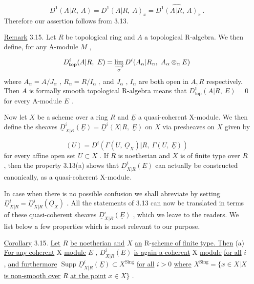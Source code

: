 \begin{equation*}
D^1(A|R,\ A) = D^1(A|R,\ A)_x = \widehat{D^1(A|R,\ A)}_x\ .
\end{equation*}
Therefore our assertion follows from 3.13.

\underline{Remark} 3.15.  Let  $R$  be topological ring and  $A$  a topological R-algebra. We then define, for any A-module  $M$  ,

\begin{equation*}
D^i_{\mathrm{top}}(A|R,\ E) = \varinjlim_{\alpha} D^i(A_\alpha|R_\alpha,\ A_\alpha \otimes_\alpha E)
\end{equation*}
where  $A_\alpha = A/J_\alpha$ , $R_\alpha = R/I_\alpha$  , and  $J_\alpha$ , $I_\alpha$  are both open in  $A, R$  respectively. Then  $A$  is formally smooth topological R-algebra means that  $D^1_{\mathrm{top}}(A|R,\ E) = 0$  for every A-module  $E$  .

        Now let  $X$  be a scheme over a ring  $R$  and  $\underline{E}$  a quasi-coherent  X-module. We then define the sheaves  $\underline{D}^i_{X|R}(\underline{E}) = \underline{D}^i(X|R,\ \underline{E})$  on  $X$  via presheaves on  $X$  given by

\begin{equation*}
[\underline{D}^i_{X|R}(\underline{E})](U) = D^i(\Gamma(U,\ \underline{O}_X)|R,\ \Gamma(U,\ \underline{E}))
\end{equation*}
for every affine open set  $U \subset X$  . If  $R$  is noetherian and  $X$  is of finite type over  $R$  , then the property 3.13(a) shows that  $\underline{D}^i_{X|R}(\underline{E})$  can actually be constructed canonically, as a quasi-coherent X-module.

        In case when there is no possible confusion we shall abreviate by setting  $\underline{D}^i_{X|R} = \underline{D}^i_{X|R}(\underline{O}_X)$  . All the statements of 3.13 can now be translated in terms of these quasi-coherent sheaves  $\underline{D}^i_{X|R}(\underline{E})$  , which we leave to the readers. We list below a few properties which is most relevant to our purpose.

\underline{Corollary} 3.15. \underline{Let}  $R$  \underline{be noetherian and}  $X$  \underline{an} R-\underline{scheme of finite type. Then}
(a)  \underline{For any coherent} X-\underline{module}  $\underline{E}$ , $\underline{D}^i_{X|R}(\underline{E})$  \underline{is again a coherent} X-\underline{module} \underline{for all}  $i$ , \underline{and furthermore}  $\operatorname{Supp} \underline{D}^i_{X|R}(\underline{E}) \subset X^{\mathrm{Sing}}$  \underline{for all}  $i > 0$  \underline{where} $X^{\mathrm{Sing}} = \{x \in X| X$ \underline{is non-smooth over}  $R$  \underline{at the point}  $x \in X\}$ .

